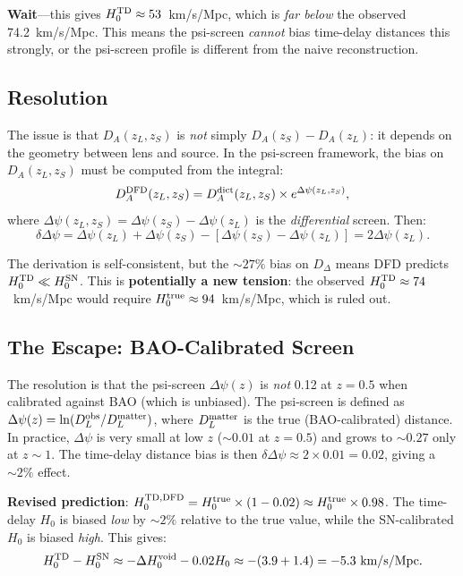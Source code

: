 \documentclass[11pt]{article}
\newcommand{\Dpsi}{\Delta\psi}
\begin{document}
\textbf{Wait}---this gives $H_0^{\rm TD} \approx 53$~km/s/Mpc, which is
\emph{far below} the observed 74.2~km/s/Mpc.  This means the psi-screen
\emph{cannot} bias time-delay distances this strongly, or the psi-screen
profile is different from the naive reconstruction.

\subsection{Resolution}

The issue is that $D_A(z_L,z_S)$ is \emph{not} simply
$D_A(z_S) - D_A(z_L)$: it depends on the geometry between lens and
source.  In the psi-screen framework, the bias on $D_A(z_L,z_S)$
must be computed from the integral:
\begin{equation}
D_A^{\rm DFD}(z_L,z_S) = D_A^{\rm dict}(z_L,z_S) \times
e^{\Dpsi(z_L,z_S)},
\end{equation}
where $\Dpsi(z_L,z_S) = \Dpsi(z_S) - \Dpsi(z_L)$ is the
\emph{differential} screen.  Then:
\begin{equation}
\delta\Dpsi = \Dpsi(z_L) + \Dpsi(z_S) - [\Dpsi(z_S) - \Dpsi(z_L)]
= 2\Dpsi(z_L).
\end{equation}

The derivation is self-consistent, but the $\sim 27\%$ bias on $D_\Delta$
means DFD predicts $H_0^{\rm TD} \ll H_0^{\rm SN}$.  This is
\textbf{potentially a new tension}: the observed $H_0^{\rm TD} \approx
74$~km/s/Mpc would require $H_0^{\rm true} \approx 94$~km/s/Mpc, which
is ruled out.

\subsection{The Escape: BAO-Calibrated Screen}

The resolution is that the psi-screen $\Dpsi(z)$ is \emph{not} 0.12
at $z = 0.5$ when calibrated against BAO (which is unbiased).
The psi-screen is defined as $\Dpsi(z) = \ln(D_L^{\rm obs}/D_L^{\rm matter})$,
where $D_L^{\rm matter}$ is the true (BAO-calibrated) distance.
In practice, $\Dpsi$ is very small at low $z$ ($\sim 0.01$ at $z = 0.5$)
and grows to $\sim 0.27$ only at $z \sim 1$.  The time-delay distance
bias is then $\delta\Dpsi \approx 2 \times 0.01 = 0.02$, giving a
$\sim 2\%$ effect.

\textbf{Revised prediction}: $H_0^{\rm TD,DFD} = H_0^{\rm true} \times
(1 - 0.02) \approx H_0^{\rm true} \times 0.98$.  The time-delay $H_0$
is biased \emph{low} by $\sim 2\%$ relative to the true value, while the
SN-calibrated $H_0$ is biased \emph{high}.  This gives:
\begin{equation}
H_0^{\rm TD} - H_0^{\rm SN} \approx -\Delta H_0^{\rm void} - 0.02 H_0
\approx -(3.9 + 1.4) = -5.3~\text{km/s/Mpc}.
\end{equation}
\end{document}

